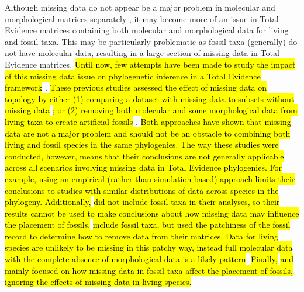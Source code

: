 \documentclass[12pt,letterpaper]{article}
\begin{document}
Although missing data do not appear be a major problem in molecular and morphological matrices separately \citep[\hl{as long as enough data overlaps in each case, and missing data are not phylogeneticaly biased;}][]{wiensmissing2003,Wiens01102005,wiensmissing2006,wiensmissing2008,lemmonthe2009,Sanderson22072011,rouresite-specific2011,pattinsonphylogeny2014}, it may become more of an issue in Total Evidence matrices containing both molecular and morphological data for living and fossil taxa.
This may be particularly problematic as fossil taxa (generally) do not have molecular data, resulting in a large section of missing data in Total Evidence matrices.
\hl{Until now, few attempts have been made to study the impact of this missing data issue on phylogenetic inference in a Total Evidence framework }\citep[\hl{i.e. using both molecular and morphological data;}][]{Wiens01102005,manosphylogeny2007,pattinsonphylogeny2014}.
\hl{These previous studies assessed the effect of missing data on topology by either (1) comparing a dataset with missing data to subsets without missing data }\citep{Wiens01102005}\hl{; or (2) removing both molecular and some morphological data from living taxa to create artificial fossils }\citep{manosphylogeny2007,pattinsonphylogeny2014}.
\hl{Both approaches have shown that missing data are not a major problem and should not be an obstacle to combining both living and fossil species in the same phylogenies.
The way these studies were conducted, however, means that their conclusions are not generally applicable across all scenarios involving missing data in Total Evidence phylogenies.
For example, using an empirical (rather than simulation based) approach limits their conclusions to studies with similar distributions of data across species in the phylogeny.
Additionally, }\cite{Wiens01102005}\hl{ did not include fossil taxa in their analyses, so their results cannot be used to make conclusions about how missing data may influence the placement of fossils.}
\cite{manosphylogeny2007,pattinsonphylogeny2014}\hl{ include fossil taxa, but used the patchiness of the fossil record to determine how to remove data from their matrices. 
Data for living species are unlikely to be missing in this patchy way, instead full molecular data with the complete absence of morphological data is a likely pattern}\citep{GuillermeCooperMissing}.
\hl{Finally, }\cite{manosphylogeny2007}\hl{ and }\cite{pattinsonphylogeny2014}\hl{ mainly focused on how missing data in fossil taxa affect the placement of fossils, ignoring the effects of missing data in living species.}
\end{document}
